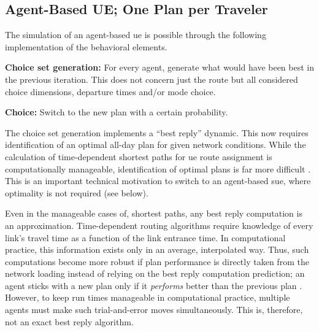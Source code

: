 \subsection{Agent-Based UE; One Plan per Traveler}
\label{sec:agent-based-ue}

The simulation of an agent-based \gls{ue} is possible through the following 
implementation of the behavioral elements.

%
%
%
%

\textbf{Choice set generation:} For every agent,
  generate what would have been best in the previous iteration.
  This does not concern just the route\corr{,}{}
  but all considered choice dimensions, \eg departure times and/or
  mode choice. 

\textbf{Choice:} Switch to the new plan with a
  certain probability.

The choice set generation implements a ``best reply'' dynamic.
This now requires identification of an optimal all-day plan for given network conditions. 
While the calculation of time-dependent shortest paths for \gls{ue} route assignment is 
computationally manageable,  identification of optimal plans is far
more difficult \citep[][]{recker-2001}. 
This is an important technical motivation to switch to an agent-based \gls{sue}, 
where optimality is not required (see below).

Even in the manageable cases of, \eg shortest paths, 
any best reply computation is an approximation.  
Time-dependent routing algorithms require knowledge of every link's travel
time as a function of the link entrance time.  In computational
practice, this information exists only in an average, 
interpolated way. Thus, such computations become more
robust if plan performance is directly taken  from the network
loading\corr{,}{} instead of relying on the best reply computation prediction;  
an agent sticks with a new plan only if it
\emph{performs} better than the previous plan
\citep{RaneyNagel2004agdb}.  However, to keep run times
manageable in computational practice, multiple agents must make
such trial-and-error moves simultaneously.  This is, therefore, not an
exact best reply algorithm.


